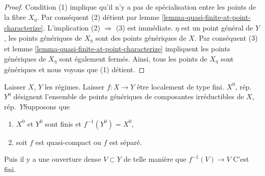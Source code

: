 \begin{proof}
Condition (1) implique qu'il n'y a pas de spécialisation entre les points de la fibre $X_\eta$. Par conséquent (2) détient par lemme \ref{lemma-quasi-finite-at-point-characterize}. L'implication (2) $\Rightarrow$ (3) est immédiate. $\eta$ est un point général de $Y$, les points génériques de $X_\eta$ sont des points génériques de $X$. Par conséquent (3) et lemme \ref{lemma-quasi-finite-at-point-characterize} impliquent les points génériques de $X_\eta$ sont également fermés. Ainsi, tous les points de $X_\eta$ sont génériques et nous voyons que (1) détient.
\end{proof}

\begin{lemma}

\label{lemma-finite-over-dense-open}

Laisser $X$, $Y$ les régimes. Laisser $f : X \to Y$ être localement de type fini. $X^0$, rép.\ $Y^0$ désignent l'ensemble de points génériques de composantes irréductibles de $X$, rép.\ $Y$Supposons que

\begin{enumerate}

\item  $X^0$ et $Y^0$ sont finis et $f^{-1}(Y^0) = X^0$,
\item soit $f$ est quasi-compact ou $f$ est séparé.

\end{enumerate}

Puis il y a une ouverture dense $V \subset Y$
de telle manière que $f^{-1}(V) \to V$ C'est fini.

\end{lemma}

